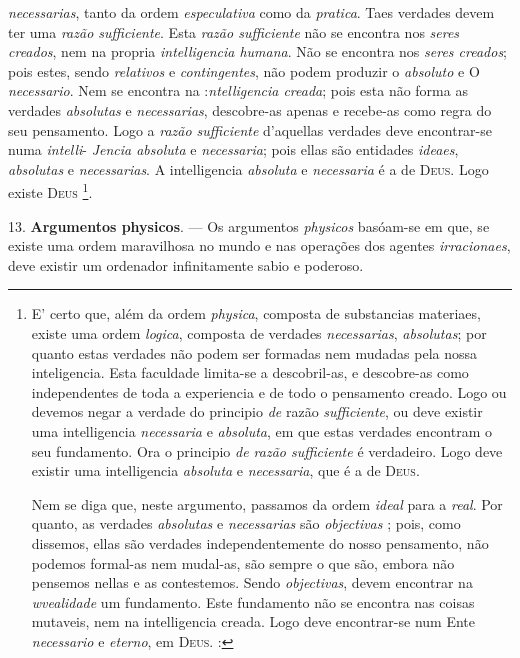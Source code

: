 \emph{necessarias}, tanto da ordem \emph{especulativa} como da \emph{pratica}. Taes verdades devem ter uma \emph{razão sufficiente}. Esta \emph{razão sufficiente} não se encontra nos \emph{seres creados}, nem na propria \emph{intelligencia humana}. Não se encontra nos \emph{seres creados}; pois estes, sendo \emph{relativos} e \emph{contingentes}, não podem produzir o \emph{absoluto} e O  \emph{necessario}. Nem se encontra na :\emph{ntelligencia creada}; pois esta não forma as verdades \emph{absolutas} e \emph{necessarias}, descobre-as apenas e recebe-as como regra do seu pensamento. Logo a \emph{razão sufficiente} d'aquellas verdades deve encontrar-se numa \emph{intelli}- \emph{Jencia absoluta} e \emph{necessaria}; pois ellas são entidades \emph{ideaes}, \emph{absolutas} e \emph{necessarias}. A intelligencia \emph{absoluta} e \emph{necessaria} é a de \textsc{Deus}. Logo existe \textsc{Deus} \footnote{E' certo que, além da ordem \emph{physica}, composta de substancias materiaes, existe uma ordem \emph{logica}, composta de verdades \emph{necessarias}, \emph{absolutas}; por quanto estas verdades não podem ser formadas nem mudadas pela nossa inteligencia. Esta faculdade limita-se a descobril-as, e descobre-as como independentes de toda a experiencia e de todo o pensamento creado. Logo ou devemos negar a verdade do principio \emph{de} razão \emph{sufficiente}, ou deve existir uma intelligencia \emph{necessaria} e \emph{absoluta}, em que estas verdades encontram o seu fundamento. Ora o principio \emph{de razão sufficiente} é verdadeiro. Logo deve existir uma intelligencia \emph{absoluta} e \emph{necessaria}, que é a de \textsc{Deus}.\par Nem se diga que, neste argumento, passamos da ordem \emph{ideal} para a \emph{real}. Por quanto, as verdades \emph{absolutas} e \emph{necessarias} são \emph{objectivas} ; pois, como dissemos, ellas são verdades independentemente do nosso pensamento, não podemos formal-as nem mudal-as, são sempre o que são, embora não pensemos nellas e as contestemos. Sendo \emph{objectivas}, devem encontrar na \emph{wvealidade} um fundamento. Este fundamento não se encontra nas coisas mutaveis, nem na intelligencia creada. Logo deve encontrar-se num Ente \emph{necessario} e \emph{eterno}, em \textsc{Deus}. :}.

13. \textbf{Argumentos physicos}. --- Os argumentos \emph{physicos} basóam-se em que, se existe uma ordem maravilhosa no mundo e nas operações dos agentes \emph{irracionaes}, deve existir um ordenador infinitamente sabio e poderoso.

